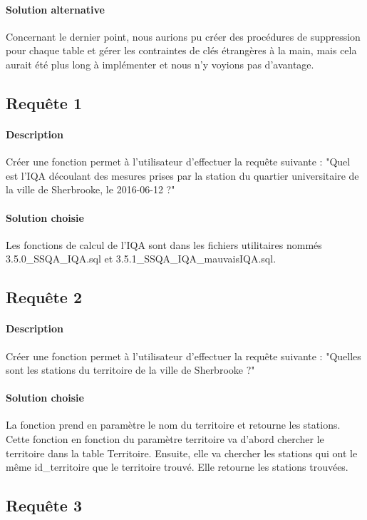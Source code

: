 \documentclass{article}
\begin{document}
\paragraph{Solution alternative}
Concernant le dernier point, nous aurions pu créer des procédures de suppression pour chaque table
et gérer les contraintes de clés étrangères à la main, mais cela aurait été plus long à implémenter
et nous n'y voyions pas d'avantage.

\subsection{Requête 1}
\paragraph{Description} Créer une fonction permet à l'utilisateur
d'effectuer la requête suivante : "Quel est l'IQA découlant des mesures
prises par la station du quartier universitaire de la ville de Sherbrooke,
le 2016-06-12 ?"

\paragraph{Solution choisie}
Les fonctions de calcul de l'IQA sont dans les fichiers utilitaires nommés 3.5.0\_SSQA\_IQA.sql et 3.5.1\_SSQA\_IQA\_mauvaisIQA.sql.

\subsection{Requête 2}
\paragraph{Description} Créer une fonction permet à l'utilisateur
d'effectuer la requête suivante : "Quelles sont les stations du territoire
de la ville de Sherbrooke ?"

\paragraph{Solution choisie}
La fonction prend en paramètre le nom du territoire et retourne les stations. 
Cette fonction en fonction du paramètre territoire va d'abord chercher le territoire dans la table Territoire. 
Ensuite, elle va chercher les stations qui ont le même id\_territoire que le territoire trouvé. Elle retourne les stations trouvées.

\subsection{Requête 3}
\end{document}
